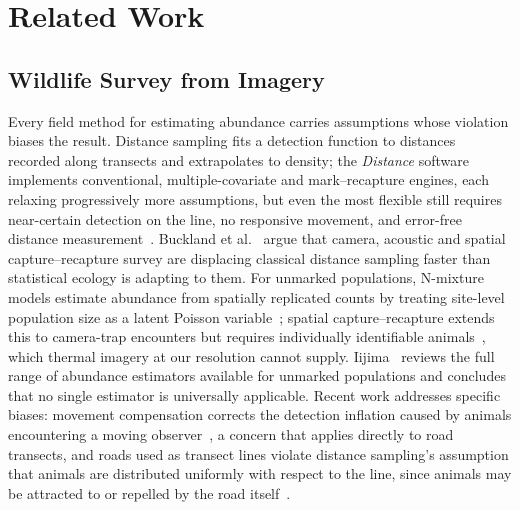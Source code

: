\section{Related Work}
\label{sec:related}

\subsection{Wildlife Survey from Imagery}

\label{sec:rw:survey}

Every field method for estimating abundance carries assumptions whose violation biases the
result. Distance sampling fits a detection function to distances recorded along transects and
extrapolates to density; the \emph{Distance} software implements conventional,
multiple-covariate and mark--recapture engines, each relaxing progressively more assumptions,
but even the most flexible still requires near-certain detection on the line, no responsive
movement, and error-free distance measurement~\cite{thomas2010distance}. Buckland et
al.~\cite{buckland2023wildlife} argue that camera, acoustic and spatial capture--recapture
survey are displacing classical distance sampling faster than statistical ecology is adapting
to them. For unmarked populations, N-mixture models estimate abundance from spatially
replicated counts by treating site-level population size as a latent Poisson
variable~\cite{royle2004nmixture}; spatial capture--recapture extends this to camera-trap
encounters but requires individually identifiable animals~\cite{royle2009bayesian}, which
thermal imagery at our resolution cannot supply. Iijima~\cite{iijima2020review} reviews the full range of abundance estimators available for unmarked populations and concludes that no single estimator is universally applicable. Recent work
addresses specific biases: movement compensation corrects the detection inflation caused by
animals encountering a moving observer~\cite{morgan2024wildlife}, a concern that applies
directly to road transects, and roads used as transect lines violate distance sampling's
assumption that animals are distributed uniformly with respect to the line, since animals
may be attracted to or repelled by the road itself~\cite{diefenbach2025accounting}.

